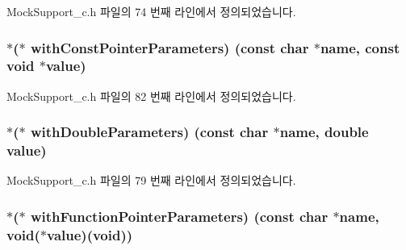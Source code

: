 Mock\+Support\+\_\+c.\+h 파일의 74 번째 라인에서 정의되었습니다.

\subsubsection[{\texorpdfstring{with\+Const\+Pointer\+Parameters}{withConstPointerParameters}}]{$\ast$($\ast$ with\+Const\+Pointer\+Parameters) (const char $\ast$name, const void $\ast$value)}\hypertarget{struct_s_mock_actual_call__c_a882f7a31df3e93a4f75b27bff07e6119}{}\label{struct_s_mock_actual_call__c_a882f7a31df3e93a4f75b27bff07e6119}


Mock\+Support\+\_\+c.\+h 파일의 82 번째 라인에서 정의되었습니다.

\subsubsection[{\texorpdfstring{with\+Double\+Parameters}{withDoubleParameters}}]{$\ast$($\ast$ with\+Double\+Parameters) (const char $\ast$name, double value)}\hypertarget{struct_s_mock_actual_call__c_a3030940bf55fa1642d0d8cb48af1e94a}{}\label{struct_s_mock_actual_call__c_a3030940bf55fa1642d0d8cb48af1e94a}


Mock\+Support\+\_\+c.\+h 파일의 79 번째 라인에서 정의되었습니다.

\subsubsection[{\texorpdfstring{with\+Function\+Pointer\+Parameters}{withFunctionPointerParameters}}]{$\ast$($\ast$ with\+Function\+Pointer\+Parameters) (const char $\ast$name, void($\ast$value)(void))}\hypertarget{struct_s_mock_actual_call__c_a6b31e94d948aa7ab66d2163f3d6debce}{}\label{struct_s_mock_actual_call__c_a6b31e94d948aa7ab66d2163f3d6debce}


